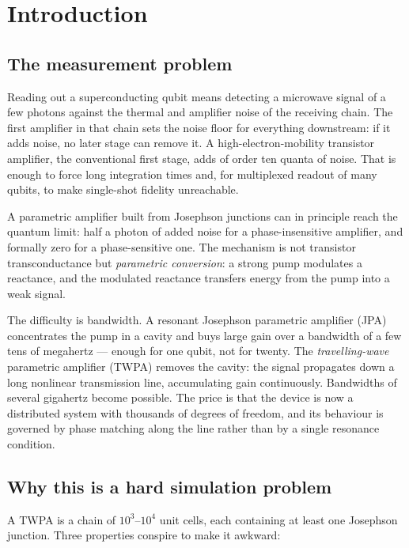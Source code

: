 \chapter{Introduction}
\label{chap:introduction}

\section{The measurement problem}

Reading out a superconducting qubit means detecting a microwave signal of a few
photons against the thermal and amplifier noise of the receiving chain. The
first amplifier in that chain sets the noise floor for everything downstream:
if it adds noise, no later stage can remove it. A high-electron-mobility
transistor amplifier, the conventional first stage, adds of order ten quanta of
noise. That is enough to force long integration times and, for multiplexed
readout of many qubits, to make single-shot fidelity unreachable.

A parametric amplifier built from Josephson junctions can in principle reach the
quantum limit: half a photon of added noise for a phase-insensitive amplifier,
and formally zero for a phase-sensitive one. The mechanism is not transistor
transconductance but \emph{parametric conversion}: a strong pump modulates a
reactance, and the modulated reactance transfers energy from the pump into a
weak signal.

The difficulty is bandwidth. A resonant Josephson parametric amplifier (JPA)
concentrates the pump in a cavity and buys large gain over a bandwidth of a few
tens of megahertz --- enough for one qubit, not for twenty. The
\emph{travelling-wave} parametric amplifier (TWPA) removes the cavity: the
signal propagates down a long nonlinear transmission line, accumulating gain
continuously. Bandwidths of several gigahertz become possible. The price is that
the device is now a distributed system with thousands of degrees of freedom, and
its behaviour is governed by phase matching along the line rather than by a
single resonance condition.

\section{Why this is a hard simulation problem}

A TWPA is a chain of $10^{3}$--$10^{4}$ unit cells, each containing at least one
Josephson junction. Three properties conspire to make it awkward:

